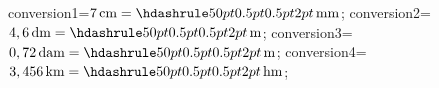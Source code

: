\documentclass[exercice]{thedocument}%
\begin{document}
%
\>conversion1=$7\,\text{cm}=\doted{50pt}\,\text{mm}$;%
\>conversion2=$4,6\,\text{dm}=\doted{50pt}\,\text{m}$;%
\>conversion3=$0,72\,\text{dam}=\doted{50pt}\,\text{m}$;%
\>conversion4=$3,456\,\text{km}=\doted{50pt}\,\text{hm}$;%
%
\end{document}
